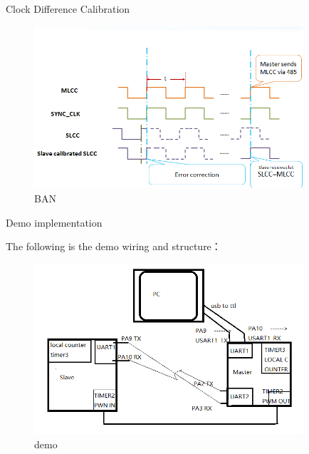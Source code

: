 \begin{frame}[fragile]{Clock Difference Calibration}

  \begin{figure}[htbp]
  \begin{center}
  \includegraphics[width=10cm]{img/flow}
  \caption{BAN }
  \label{Overview}
  \end{center}
  \vspace{-0.5em}
  \end{figure}

\end{frame}






\begin{frame}[fragile]{Demo implementation}

The following is the demo wiring and structure：
\begin{figure}[htbp]
\begin{center}
\includegraphics[width=10cm]{img/demo0}
\caption{demo}
\label{Overview}
\end{center}
\vspace{-0.5em}
\end{figure}

\end{frame}
